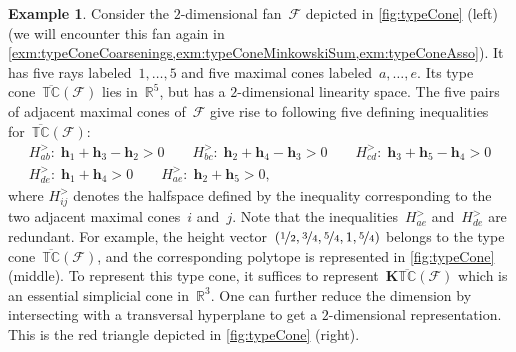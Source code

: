 \documentclass{amsart}
\theoremstyle{definition}
\newtheorem{example}[theorem]{Example}
\newcommand{\R}{\mathbb{R}} %
\renewcommand{\b}[1]{{\boldsymbol{#1}}} %
\newcommand{\Fan}{\mathcal{F}} %
\newcommand{\ctypeCone}{\overline{\mathbb{TC}}} %
\begin{document}
\begin{example}
\label{exm:typeCone}
\enlargethispage{.5cm}
Consider the $2$-dimensional fan~$\Fan$ depicted in \cref{fig:typeCone} (left) (we will encounter this fan again in \cref{exm:typeConeCoarsenings,exm:typeConeMinkowskiSum,exm:typeConeAsso}).
It has five rays labeled~$1, \dots, 5$ and five maximal cones labeled~$a,\dots, e$.
Its type cone~$\ctypeCone(\Fan)$ lies in~$\R^5$, but has a $2$-dimensional linearity space.
The five pairs of adjacent maximal cones of~$\Fan$ give rise to following five defining inequalities for~$\ctypeCone(\Fan)$:
\begin{gather*}
H^>_{ab}: \; \b{h}_1 + \b{h}_3 - \b{h}_2 > 0
\qquad
H^>_{bc}: \; \b{h}_2 + \b{h}_4 - \b{h}_3 > 0
\qquad
H^>_{cd}: \; \b{h}_3 + \b{h}_5 - \b{h}_4 > 0
\\
H^>_{de}: \; \b{h}_1 + \b{h}_4 > 0
\qquad
H^>_{ae}: \; \b{h}_2 + \b{h}_5 > 0,
\end{gather*}
where $H^>_{ij}$ denotes the halfspace defined by the inequality corresponding to the two adjacent maximal cones~$i$ and~$j$.
Note that the inequalities~$H^>_{ae}$ and~$H^>_{de}$ are redundant.
For example, the height vector~$(\nicefrac{1}{2}, \nicefrac{3}{4}, \nicefrac{5}{4}, 1, \nicefrac{5}{4})$ belongs to the type cone~$\ctypeCone(\Fan)$, and the corresponding polytope is represented in \cref{fig:typeCone} (middle).
To represent this type cone, it suffices to represent~$\b{K}\ctypeCone(\Fan)$ which is an essential simplicial cone in~$\R^3$.
One can further reduce the dimension by intersecting with a transversal hyperplane to get a $2$-dimensional representation.
This is the red triangle depicted in \cref{fig:typeCone} (right).


\end{example}
\end{document}
